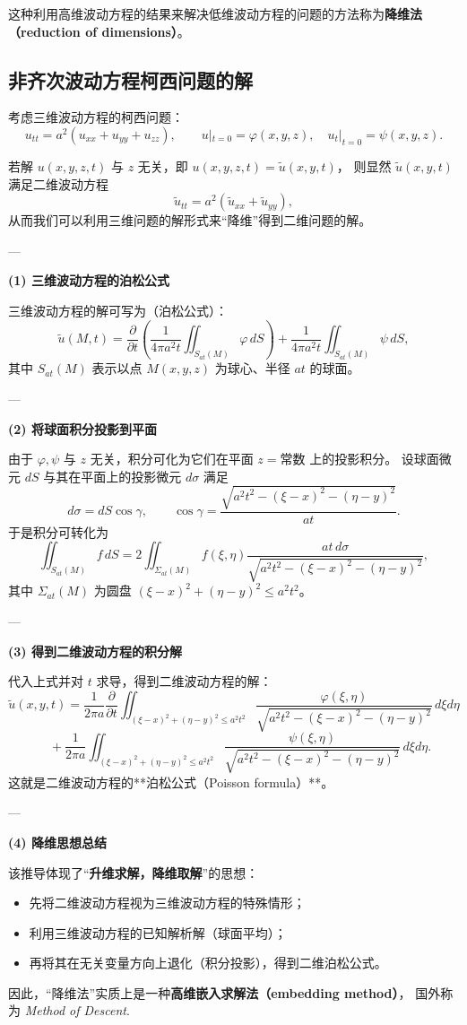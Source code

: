 \begin{solution}
\begin{remark}[降维法的基本思想]
这种利用高维波动方程的结果来解决低维波动方程的问题的方法称为\textbf{降维法（reduction of dimensions）}。
\end{remark}
\subsection{非齐次波动方程柯西问题的解}
\end{solution}
\begin{example}[降维法推导二维波动方程的泊松公式]
考虑三维波动方程的柯西问题：
\[
u_{tt}=a^2(u_{xx}+u_{yy}+u_{zz}),\qquad 
u|_{t=0}=\varphi(x,y,z),\quad u_t|_{t=0}=\psi(x,y,z).
\]

若解 $u(x,y,z,t)$ 与 $z$ 无关，即 $u(x,y,z,t)=\tilde{u}(x,y,t)$，
则显然 $\tilde{u}(x,y,t)$ 满足二维波动方程
\[
\tilde{u}_{tt}=a^2(\tilde{u}_{xx}+\tilde{u}_{yy}),
\]
从而我们可以利用三维问题的解形式来“降维”得到二维问题的解。

---

\textbf{(1) 三维波动方程的泊松公式}

三维波动方程的解可写为（泊松公式）：
\[
\tilde{u}(M,t)
= \frac{\partial}{\partial t}
\left(
  \frac{1}{4\pi a^2t}
  \iint_{S_{at}(M)} \varphi\, dS
\right)
+\frac{1}{4\pi a^2t}
  \iint_{S_{at}(M)} \psi\, dS,
\]
其中 $S_{at}(M)$ 表示以点 $M(x,y,z)$ 为球心、半径 $a t$ 的球面。

---

\textbf{(2) 将球面积分投影到平面}

由于 $\varphi,\psi$ 与 $z$ 无关，积分可化为它们在平面 $z=\text{常数}$ 上的投影积分。
设球面微元 $dS$ 与其在平面上的投影微元 $d\sigma$ 满足
\[
d\sigma = dS \cos\gamma, \qquad 
\cos\gamma = \frac{\sqrt{a^2t^2-(\xi-x)^2-(\eta-y)^2}}{a t}.
\]
于是积分可转化为
\[
\iint_{S_{at}(M)} f\, dS 
= 2 \iint_{\Sigma_{at}(M)} 
  f(\xi,\eta)
  \frac{a t\, d\sigma}
  {\sqrt{a^2t^2-(\xi-x)^2-(\eta-y)^2}},
\]
其中 $\Sigma_{at}(M)$ 为圆盘 $(\xi-x)^2+(\eta-y)^2\le a^2t^2$。

---

\textbf{(3) 得到二维波动方程的积分解}

代入上式并对 $t$ 求导，得到二维波动方程的解：
\[
\tilde{u}(x,y,t)
= \frac{1}{2\pi a}
\frac{\partial}{\partial t}
\iint_{(\xi-x)^2+(\eta-y)^2\le a^2t^2}
\frac{\varphi(\xi,\eta)}{\sqrt{a^2t^2-(\xi-x)^2-(\eta-y)^2}}\, d\xi d\eta
\]
\[
\quad
+ \frac{1}{2\pi a}
\iint_{(\xi-x)^2+(\eta-y)^2\le a^2t^2}
\frac{\psi(\xi,\eta)}{\sqrt{a^2t^2-(\xi-x)^2-(\eta-y)^2}}\, d\xi d\eta.
\]
这就是二维波动方程的**泊松公式（Poisson formula）**。

---

\textbf{(4) 降维思想总结}

该推导体现了“\textbf{升维求解，降维取解}”的思想：
\begin{itemize}
  \item 先将二维波动方程视为三维波动方程的特殊情形；
  \item 利用三维波动方程的已知解析解（球面平均）；
  \item 再将其在无关变量方向上退化（积分投影），得到二维泊松公式。
\end{itemize}
因此，“降维法”实质上是一种\textbf{高维嵌入求解法（embedding method）}，
国外称为 \emph{Method of Descent}.
\end{example}
